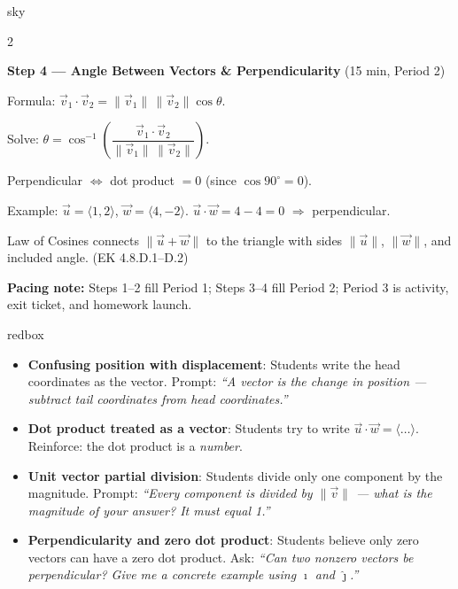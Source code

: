 \documentclass[10pt]{article}
\begin{document}
\begin{skillbox}{sky}
\begin{multicols}{2}
\columnbreak

\textbf{Step 4 --- Angle Between Vectors \& Perpendicularity} (15 min, Period 2)

Formula: $\vec{v}_1\cdot\vec{v}_2=\|\vec{v}_1\|\,\|\vec{v}_2\|\cos\theta$.

Solve: $\theta=\cos^{-1}\!\left(\dfrac{\vec{v}_1\cdot\vec{v}_2}
{\|\vec{v}_1\|\,\|\vec{v}_2\|}\right)$.

Perpendicular $\Leftrightarrow$ dot product $=0$ (since $\cos 90^\circ=0$).

Example: $\vec{u}=\langle 1,2\rangle$, $\vec{w}=\langle 4,-2\rangle$.
$\vec{u}\cdot\vec{w}=4-4=0$ $\Rightarrow$ perpendicular.

Law of Cosines connects $\|\vec{u}+\vec{w}\|$ to the triangle with sides
$\|\vec{u}\|$, $\|\vec{w}\|$, and included angle. (EK 4.8.D.1--D.2)

\end{multicols}

\smallskip
\textbf{Pacing note:} Steps 1--2 fill Period 1; Steps 3--4 fill Period 2;
Period 3 is activity, exit ticket, and homework launch.
\end{skillbox}

\vspace{0.08in}

\begin{skillbox}{redbox}
\begin{itemize}[leftmargin=1.4em, itemsep=3pt]
  \item \textbf{Confusing position with displacement}: Students write the
    head coordinates as the vector. Prompt: \textit{``A vector is the
    \emph{change} in position --- subtract tail coordinates from head coordinates.''}
  \item \textbf{Dot product treated as a vector}: Students try to write
    $\vec{u}\cdot\vec{w}=\langle\ldots\rangle$. Reinforce: the dot product
    is a \emph{number}.
  \item \textbf{Unit vector partial division}: Students divide only one
    component by the magnitude. Prompt: \textit{``Every component is divided
    by $\|\vec{v}\|$ --- what is the magnitude of your answer? It must equal 1.''}
  \item \textbf{Perpendicularity and zero dot product}: Students believe only
    zero vectors can have a zero dot product. Ask: \textit{``Can two nonzero
    vectors be perpendicular? Give me a concrete example using
    $\hat{\imath}$ and $\hat{\jmath}$.''}
\end{itemize}
\end{skillbox}
\end{document}
